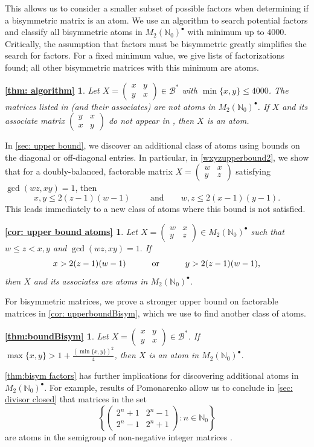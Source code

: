 \documentclass{amsart}
\newcommand{\pmx}[4]{\begin{pmatrix} #1 & #2 \\ #3 & #4 \end{pmatrix}}
\newcommand{\mtwo}{M_2(\mathbb{N}_0)^\bullet}
\newcommand{\Bstar}{\mathcal{B}^*}
\begin{document}
This allows us to consider a smaller subset of possible factors when determining if a bisymmetric matrix is an atom. We use an algorithm to search potential factors and classify all bisymmetric atoms in $\mtwo$ with minimum up to $4000$. Critically, the assumption that factors must be bisymmetric greatly simplifies the search for factors. For a fixed minimum value, we give lists of factorizations found; all other bisymmetric matrices with this minimum are atoms.

\newtheorem*{thm71}{\cref{thm: algorithm}}
\begin{thm71}
Let $X=\pmx{x}{y}{y}{x} \in \Bstar$ with $\min\{x,y\}\leq 4000$. The matrices listed in \cite{BisymData26} (and their associates) are not atoms in $\mtwo$. If $X$ and its associate matrix $\pmx{y}{x}{x}{y}$ do not appear in \cite{BisymData26}, then $X$ is an atom.
\end{thm71}

In \cref{sec: upper bound}, we discover an additional class of atoms using bounds on the diagonal or off-diagonal entries. In particular, in \cref{wxyzupperbound2},  we show that for a doubly-balanced, factorable matrix $X = \pmx{w}{x}{y}{z}$ satisfying $\gcd(wz, xy)=1$, then 
$$x,y\le2(z-1)(w-1)\qquad\text{ and}\qquad
w, z \leq 2(x-1)(y-1).$$
This leads immediately to a new class of atoms where this bound is not satisfied.
\newtheorem*{cor1}{\cref{cor: upper bound atoms}}
\begin{cor1}
    Let $X=\pmx{w}{x}{y}{z}\in \mtwo$ such that $w\le z<x,y$ and $\gcd{(wz, xy)}=1.$ If $$x>2(z-1)(w-1) \text{ \hspace{2pc} or \hspace{2pc} } y>2(z-1)(w-1),$$ then $X$ and its associates are atoms in $\mtwo$.
\end{cor1}


For bisymmetric matrices, we prove a stronger upper bound on factorable matrices in \cref{cor: upperboundBisym}, which we use to find another class of atoms.

\newtheorem*{cor64}{\cref{thm:boundBisym}}
\begin{cor64} Let $X=\pmx{x}{y}{y}{x} \in \Bstar$. If $\max\{x,y\}> 1+ \frac{(\min\{x,y\})^2}{4}$, then $X$ is an atom in $\mtwo$.
\end{cor64}

\cref{thm:bisym factors} has further implications for discovering additional atoms in $\mtwo$. For example, results of Pomonarenko allow us to conclude in \cref{sec: divisor closed} that matrices in the set
$$\left \{\pmx{2^n+1}{2^n-1}{2^n-1}{2^n+1}:n\in \mathbb{N}_0\right\}$$
are atoms in the semigroup of non-negative integer matrices \cite[Theorem 5]{Ponom22}. 
\end{document}
